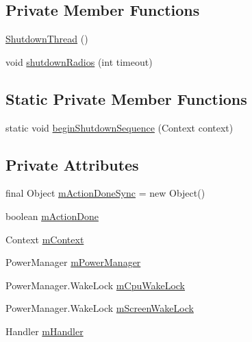 \subsection*{Private Member Functions}
\begin{DoxyCompactItemize}
\item 
\hyperlink{classcom_1_1android_1_1server_1_1power_1_1ShutdownThread_af4107d52a5c2dbb49f6a55a8b576a815}{Shutdown\-Thread} ()
\item 
void \hyperlink{classcom_1_1android_1_1server_1_1power_1_1ShutdownThread_aaf9b8e8c862e7616425c96d038ca4bfc}{shutdown\-Radios} (int timeout)
\end{DoxyCompactItemize}
\subsection*{Static Private Member Functions}
\begin{DoxyCompactItemize}
\item 
static void \hyperlink{classcom_1_1android_1_1server_1_1power_1_1ShutdownThread_a856141299b5f4c13c488694d605a732d}{begin\-Shutdown\-Sequence} (Context context)
\end{DoxyCompactItemize}
\subsection*{Private Attributes}
\begin{DoxyCompactItemize}
\item 
final Object \hyperlink{classcom_1_1android_1_1server_1_1power_1_1ShutdownThread_a54e622b02af832292d5cbe23bfbc6e53}{m\-Action\-Done\-Sync} = new Object()
\item 
boolean \hyperlink{classcom_1_1android_1_1server_1_1power_1_1ShutdownThread_ace4b71fc19e14df65e235dbadb1891c7}{m\-Action\-Done}
\item 
Context \hyperlink{classcom_1_1android_1_1server_1_1power_1_1ShutdownThread_ac0b2ed9fe29f53d29509bfa5a7890a24}{m\-Context}
\item 
Power\-Manager \hyperlink{classcom_1_1android_1_1server_1_1power_1_1ShutdownThread_af6280613eb53e0d6cc42d5329144c2c3}{m\-Power\-Manager}
\item 
Power\-Manager.\-Wake\-Lock \hyperlink{classcom_1_1android_1_1server_1_1power_1_1ShutdownThread_a82b5c2529753eb1e63d0827e1757de8f}{m\-Cpu\-Wake\-Lock}
\item 
Power\-Manager.\-Wake\-Lock \hyperlink{classcom_1_1android_1_1server_1_1power_1_1ShutdownThread_ae22b87748d12c25b168d7bcf44edbcd4}{m\-Screen\-Wake\-Lock}
\item 
Handler \hyperlink{classcom_1_1android_1_1server_1_1power_1_1ShutdownThread_a165f4b311ee1eebff6213f5f84820b31}{m\-Handler}
\end{DoxyCompactItemize}
